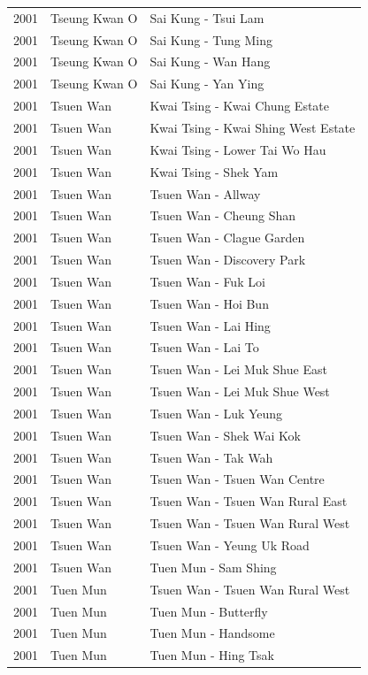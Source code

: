 \begin{longtable}{p{1.2cm}p{3cm}p{7cm}}
2001 & Tseung Kwan O & Sai Kung - Tsui Lam \\
2001 & Tseung Kwan O & Sai Kung - Tung Ming \\
2001 & Tseung Kwan O & Sai Kung - Wan Hang \\
2001 & Tseung Kwan O & Sai Kung - Yan Ying \\
2001 & Tsuen Wan & Kwai Tsing - Kwai Chung Estate \\
2001 & Tsuen Wan & Kwai Tsing - Kwai Shing West Estate \\
2001 & Tsuen Wan & Kwai Tsing - Lower Tai Wo Hau \\
2001 & Tsuen Wan & Kwai Tsing - Shek Yam \\
2001 & Tsuen Wan & Tsuen Wan - Allway \\
2001 & Tsuen Wan & Tsuen Wan - Cheung Shan \\
2001 & Tsuen Wan & Tsuen Wan - Clague Garden \\
2001 & Tsuen Wan & Tsuen Wan - Discovery Park \\
2001 & Tsuen Wan & Tsuen Wan - Fuk Loi \\
2001 & Tsuen Wan & Tsuen Wan - Hoi Bun \\
2001 & Tsuen Wan & Tsuen Wan - Lai Hing \\
2001 & Tsuen Wan & Tsuen Wan - Lai To \\
2001 & Tsuen Wan & Tsuen Wan - Lei Muk Shue East \\
2001 & Tsuen Wan & Tsuen Wan - Lei Muk Shue West \\
2001 & Tsuen Wan & Tsuen Wan - Luk Yeung \\
2001 & Tsuen Wan & Tsuen Wan - Shek Wai Kok \\
2001 & Tsuen Wan & Tsuen Wan - Tak Wah \\
2001 & Tsuen Wan & Tsuen Wan - Tsuen Wan Centre \\
2001 & Tsuen Wan & Tsuen Wan - Tsuen Wan Rural East \\
2001 & Tsuen Wan & Tsuen Wan - Tsuen Wan Rural West \\
2001 & Tsuen Wan & Tsuen Wan - Yeung Uk Road \\
2001 & Tsuen Wan & Tuen Mun - Sam Shing \\
2001 & Tuen Mun & Tsuen Wan - Tsuen Wan Rural West \\
2001 & Tuen Mun & Tuen Mun - Butterfly \\
2001 & Tuen Mun & Tuen Mun - Handsome \\
2001 & Tuen Mun & Tuen Mun - Hing Tsak \\

\end{longtable}
